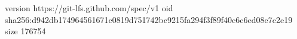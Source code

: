 version https://git-lfs.github.com/spec/v1
oid sha256:d942db174964561671c0819d751742bc9215fa294f3f89f40c6c6ed08e7c2e19
size 176754
